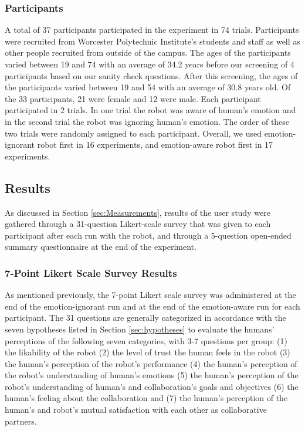 \documentclass[12pt]{report}
\begin{document}
\subsubsection{Participants}
\label{sec:Participants}
A total of 37 participants participated in the experiment in 74 trials.
Participants were recruited from Worcester Polytechnic Institute's students and
staff as well as other people recruited from outside of the campus. The ages
of the participants varied between 19 and 74 with an average of 34.2 years
before our screening of 4 participants based on our sanity check questions. After
this screening, the ages of the participants varied between 19 and 54 with an
average of 30.8 years old. Of the 33 participants, 21 were female and 12
were male. Each participant participated in 2 trials. In one trial the robot was
aware of human's emotion and in the second trial the robot was ignoring human's
emotion. The order of these two trials were randomly assigned to each
participant. Overall, we used emotion-ignorant robot first in 16 experiments,
and emotion-aware robot first in 17 experiments.

\subsection{Results}

As discussed in Section \ref{sec:Measurements}, results of the user study were
gathered through a 31-question Likert-scale survey that was given to each
participant after each run with the robot, and through a 5-question open-ended
summary questionnaire at the end of the experiment.

\subsubsection{7-Point Likert Scale Survey Results}
As mentioned previously, the 7-point Likert scale survey was administered at
the end of the emotion-ignorant run and at the end of the emotion-aware run for
each participant. The 31 questions are generally categorized in accordance
with the seven hypotheses listed in Section \ref{sec:hypotheses} to evaluate the
humans' perceptions of the following seven categories, with 3-7 questions per
group: (1) the likability of the robot (2) the level of trust the human feels in
the robot (3) the human's perception of the robot's performance (4) the human's
perception of the robot's understanding of human's emotions (5) the human's
perception of the robot's understanding of human's and collaboration's goals and
objectives (6) the human's feeling about the collaboration and (7) the human's
perception of the human's and robot's mutual satisfaction with each other as
collaborative partners. 
\end{document}
